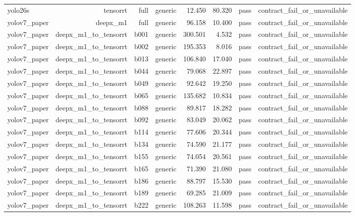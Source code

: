 \begin{table}[t]
\begin{tabular}{lrrrrrrr}
yolo26s & tensorrt & full & generic & 12.450 & 80.320 & pass & contract\_fail\_or\_unavailable \\
yolov7\_paper & deepx\_m1 & full & generic & 96.158 & 10.400 & pass & contract\_fail\_or\_unavailable \\
yolov7\_paper & deepx\_m1\_to\_tensorrt & b001 & generic & 300.501 & 4.532 & pass & contract\_fail\_or\_unavailable \\
yolov7\_paper & deepx\_m1\_to\_tensorrt & b002 & generic & 195.353 & 8.016 & pass & contract\_fail\_or\_unavailable \\
yolov7\_paper & deepx\_m1\_to\_tensorrt & b013 & generic & 106.840 & 17.040 & pass & contract\_fail\_or\_unavailable \\
yolov7\_paper & deepx\_m1\_to\_tensorrt & b044 & generic & 79.068 & 22.897 & pass & contract\_fail\_or\_unavailable \\
yolov7\_paper & deepx\_m1\_to\_tensorrt & b049 & generic & 92.642 & 19.250 & pass & contract\_fail\_or\_unavailable \\
yolov7\_paper & deepx\_m1\_to\_tensorrt & b065 & generic & 135.682 & 10.834 & pass & contract\_fail\_or\_unavailable \\
yolov7\_paper & deepx\_m1\_to\_tensorrt & b088 & generic & 89.817 & 18.282 & pass & contract\_fail\_or\_unavailable \\
yolov7\_paper & deepx\_m1\_to\_tensorrt & b092 & generic & 83.049 & 20.062 & pass & contract\_fail\_or\_unavailable \\
yolov7\_paper & deepx\_m1\_to\_tensorrt & b114 & generic & 77.606 & 20.344 & pass & contract\_fail\_or\_unavailable \\
yolov7\_paper & deepx\_m1\_to\_tensorrt & b134 & generic & 74.590 & 21.177 & pass & contract\_fail\_or\_unavailable \\
yolov7\_paper & deepx\_m1\_to\_tensorrt & b155 & generic & 74.054 & 20.561 & pass & contract\_fail\_or\_unavailable \\
yolov7\_paper & deepx\_m1\_to\_tensorrt & b165 & generic & 71.390 & 21.080 & pass & contract\_fail\_or\_unavailable \\
yolov7\_paper & deepx\_m1\_to\_tensorrt & b186 & generic & 88.797 & 15.530 & pass & contract\_fail\_or\_unavailable \\
yolov7\_paper & deepx\_m1\_to\_tensorrt & b189 & generic & 69.285 & 21.009 & pass & contract\_fail\_or\_unavailable \\
yolov7\_paper & deepx\_m1\_to\_tensorrt & b222 & generic & 108.263 & 11.598 & pass & contract\_fail\_or\_unavailable \\

\end{tabular}
\end{table}
